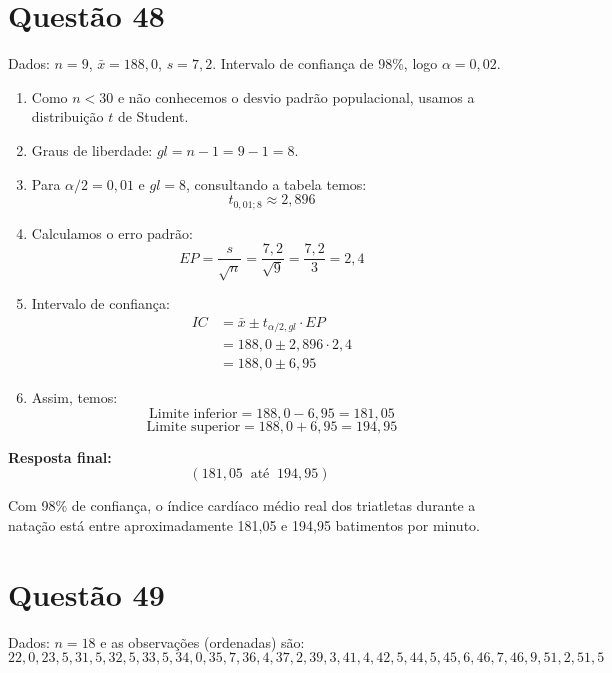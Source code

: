 \documentclass[12pt]{article}
\newcommand{\quest}[1]{\section*{Questão #1}} %
\begin{document}
\quest{48}
Dados: $n=9$, $\bar{x}=188,0$, $s=7,2$. Intervalo de confiança de 98\%, logo $\alpha=0,02$.

\begin{enumerate}
    \item Como $n < 30$ e não conhecemos o desvio padrão populacional, usamos a distribuição $t$ de Student.
    \item Graus de liberdade: $gl = n-1 = 9-1=8$.
    \item Para $\alpha/2=0,01$ e $gl=8$, consultando a tabela temos:
    \[
    t_{0,01;8} \approx 2,896
    \]
    \item Calculamos o erro padrão:
    \[
    EP = \frac{s}{\sqrt{n}} = \frac{7,2}{\sqrt{9}} = \frac{7,2}{3} = 2,4
    \]
    \item Intervalo de confiança:
    \begin{align*}
        IC &= \bar{x} \pm t_{\alpha/2,gl} \cdot EP \\
           &= 188,0 \pm 2,896 \cdot 2,4 \\
           &= 188,0 \pm 6,95
    \end{align*}
    \item Assim, temos:
    \[
    \text{Limite inferior} = 188,0 - 6,95 = 181,05
    \]
    \[
    \text{Limite superior} = 188,0 + 6,95 = 194,95
    \]
\end{enumerate}

\textbf{Resposta final:}
\[
\boxed{(181,05 \;\;\text{até}\;\; 194,95)}
\]

Com 98\% de confiança, o índice cardíaco médio real dos triatletas durante a natação está entre aproximadamente 181,05 e 194,95 batimentos por minuto.

\quest{49}

Dados: $n=18$ e as observações (ordenadas) são:
\[
22,0, 23,5, 31,5, 32,5, 33,5, 34,0, 35,7, 36,4, 37,2, 39,3, 41,4, 42,5, 44,5, 45,6, 46,7, 46,9, 51,2, 51,5
\]
\end{document}
